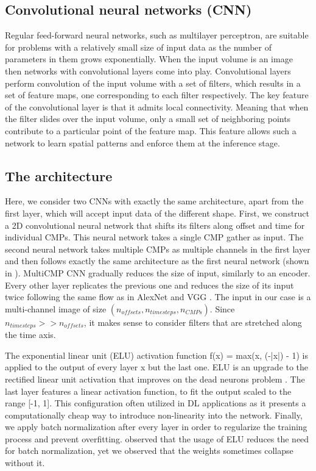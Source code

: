 \documentclass[paper,twocolomn]{geophysics}
\begin{document}
\subsection{Convolutional neural networks (CNN)}
Regular feed-forward neural networks, such as multilayer perceptron, are suitable for problems with a relatively small size of input data as the number of parameters in them grows exponentially. When the input volume is an image then networks with convolutional layers come into play. Convolutional layers perform convolution of the input volume with a set of filters, which results in a set of feature maps, one corresponding to each filter respectively. The key feature of the convolutional layer is that it admits local connectivity. Meaning that when the filter slides over the input volume, only a small set of neighboring points contribute to a particular point of the feature map. This feature allows such a network to learn spatial patterns and enforce them at the inference stage.

\subsection{The architecture}
Here, we consider two CNNs with exactly the same architecture, apart from the first layer, which will accept input data of the different shape.
%
First, we construct a 2D convolutional neural network that shifts its filters along offset and time for individual CMPs. This neural network takes a single CMP gather as input.
The second neural network takes multiple CMPs as multiple channels in the first layer and then follows exactly the same architecture as the first neural network (shown in ). 
MultiCMP CNN gradually reduces the size of input, similarly to an encoder. Every other layer replicates the previous one and reduces the size of its input twice following the same flow as in AlexNet \citep{krizhevsky2012imagenet} and VGG \citep{simonyan2014very}. The input in our case is a multi-channel image of size $(n_{offsets}, n_{timesteps}, n_{CMPs})$. Since $n_{timesteps} >> n_{offsets}$, it makes sense to consider filters that are stretched along the time axis. 

The exponential linear unit (ELU) activation function 
\beq
f(x) = max(x, \exp(-|x|) - 1)
\eeq
is applied to the output of every layer x but the last one. ELU is an upgrade to the rectified linear unit activation that improves on the dead neurons problem \citep{clevert2015fast}. The last layer features a linear activation function, to fit the output scaled to the range [-1, 1]. This configuration  often utilized in DL applications as it presents a computationally cheap way to introduce non-linearity into the network. 
Finally, we apply batch normalization after every layer in order to regularize the training process and prevent overfitting. \cite{clevert2015fast} observed that the usage of ELU reduces the need for batch normalization, yet we observed that the weights sometimes collapse  without it.
\end{document}

